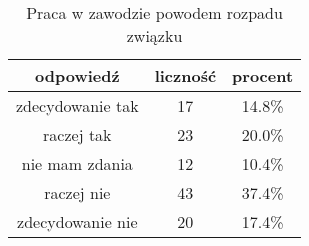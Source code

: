 \begin{table}[H]
\caption{Praca w zawodzie powodem rozpadu związku}
\centering
\begin{tabular}{ | c | c | c |}
\hline
odpowiedź & liczność & procent\\
\hline
zdecydowanie tak  &  17  & 14.8\% \\
\hline
raczej tak  &  23  & 20.0\% \\
\hline
nie mam zdania  &  12  & 10.4\% \\
\hline
raczej nie  &  43  & 37.4\% \\
\hline
zdecydowanie nie  &  20  & 17.4\% \\
\hline
\end{tabular}
\label{tab:Q29}
\end{table}
